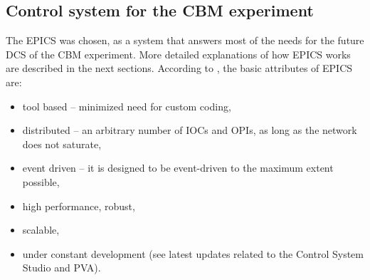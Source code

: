 



\subsection{Control system for the CBM experiment}
The \gls{EPICS} was chosen, as a system that answers most of the needs for the future \gls{DCS} of the \gls{CBM} experiment. More detailed explanations of how \gls{EPICS} works are described in the next sections. According to \cite{EPICS_DOCS}, the basic attributes of \gls{EPICS} are:
\begin{itemize}
    \item tool based -- minimized need for custom coding,
    \item distributed -- an arbitrary number of \glspl{IOC} and \glspl{OPI}, as long as the network does not saturate,
    \item event driven -- it is designed to be event-driven to the maximum extent possible,
    \item high performance, robust,
    \item scalable,
    \item under constant development (see latest updates related to the Control System Studio and PVA).
\end{itemize}


